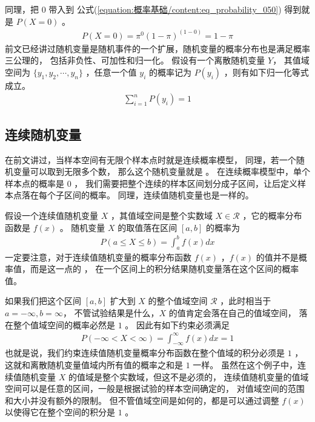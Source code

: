 \documentclass[letterpaper,10pt,english]{sphinxmanual}
\begin{document}
同理，把 \(0\) 带入到 公式(\ref{equation:概率基础/content:eq_probability_050}) 得到就是
\(P(X=0)\) 。
\begin{equation}\label{equation:概率基础/content:概率基础/content:29}
\begin{split}P(X=0) = \pi^0(1-\pi)^{(1-0)}= 1 - \pi\end{split}
\end{equation}
前文已经讲过随机变量是随机事件的一个扩展，随机变量的概率分布也是满足概率三公理的，
包括非负性、可加性和归一化。
假设有一个离散随机变量 \(Y\)，
其值域空间为 \(\{y_1,y_2,\cdots,y_n\}\)
，任意一个值 \(y_i\) 的概率记为 \(P(y_i)\)
，则有如下归一化等式成立。
\begin{equation}\label{equation:概率基础/content:概率基础/content:30}
\begin{split}\sum_{i=1}^n P(y_i) = 1\end{split}
\end{equation}

\subsection{连续随机变量}
\label{\detokenize{_u6982_u7387_u57fa_u7840/content:id12}}
在前文讲过，当样本空间有无限个样本点时就是连续概率模型，
同理，若一个随机变量可以取到无限多个数，
那么这个随机变量就是  。
在连续概率模型中，单个样本点的概率是 \(0\) ，
我们需要把整个连续的样本区间划分成子区间，让后定义样本点落在每个子区间的概率。
同理，连续值随机变量也是一样的。

假设一个连续值随机变量 \(X\) ，其值域空间是整个实数域 \(X \in \mathcal{R}\)
，它的概率分布函数是 \(f(x)\) 。
随机变量 \(X\) 的取值落在区间 \([a,b]\) 的概率为
\begin{equation}\label{equation:概率基础/content:概率基础/content:31}
\begin{split}P(a \le X \le b) = \int_a^b f(x) dx\end{split}
\end{equation}
一定要注意，对于连续值随机变量的概率分布函数 \(f(x)\)
，\(f(x)\) 的值并不是概率值，而是这一点的  ，
在一个区间上的积分结果随机变量落在这个区间的概率值。

如果我们把这个区间 \([a,b]\) 扩大到 \(X\) 的整个值域空间 \(\mathcal{R}\)
，此时相当于 \(a=-\infty,b=\infty\)，
不管试验结果是什么，\(X\) 的值肯定会落在自己的值域空间，
落在整个值域空间的概率必然是 \(1\) 。
因此有如下约束必须满足
\begin{equation}\label{equation:概率基础/content:概率基础/content:32}
\begin{split}P(- \infty < X < \infty) = \int_{- \infty}^{\infty} f(x) dx = 1\end{split}
\end{equation}
也就是说，我们约束连续值随机变量概率分布函数在整个值域的积分必须是 \(1\)
，这就和离散随机变量值域内所有值的概率之和是 \(1\) 一样。
虽然在这个例子中，连续值随机变量 \(X\) 的值域是整个实数域，但这不是必须的，
连续值随机变量的值域空间可以是任意的区间，一般是根据试验的样本空间确定的，
对值域空间的范围和大小并没有额外的限制。
但不管值域空间是如何的，都是可以通过调整 \(f(x)\)
以使得它在整个空间的积分是 \(1\) 。
\end{document}
